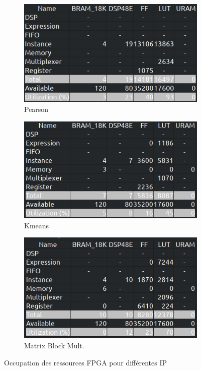 \documentclass[12pt,a4paper]{article}
\begin{document}
\begin{figure}[H]
	\centering
	\begin{subfigure}[H]{.31\linewidth}
		\centering
		\includegraphics[width=\linewidth]{hls_fig/screenshot001}
		\caption{Pearson}
	\end{subfigure}
	\begin{subfigure}[H]{.31\linewidth}
		\centering
		\includegraphics[width=\linewidth]{hls_fig/screenshot002}
		\caption{Kmeans}
	\end{subfigure}
	\begin{subfigure}[H]{.31\linewidth}
		\centering
		\includegraphics[width=\linewidth]{hls_fig/screenshot003}
		\caption{Matrix Block Mult.}
	\end{subfigure}	
	\caption{Occupation des ressources FPGA pour différentes IP}
	\label{fig-hls}
\end{figure}
\end{document}
